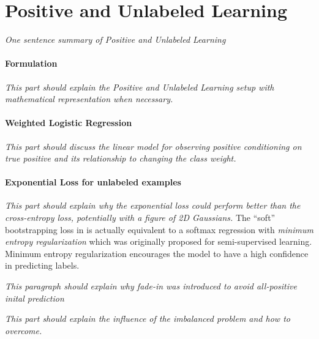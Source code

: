 \section{Positive and Unlabeled Learning}
\label{sec:pulearning}

\textit{One sentence summary of Positive and Unlabeled Learning}


\paragraph{Formulation}
\noindent
\textit{This part should explain the Positive and Unlabeled Learning setup with mathematical representation when necessary.}


\paragraph{Weighted Logistic Regression}
\noindent
\textit{This part should discuss the linear model for observing positive conditioning on true positive and its relationship to changing the class weight.}


\paragraph{Exponential Loss for unlabeled examples}
\noindent
\textit{This part should explain why the exponential loss could perform better than the cross-entropy loss, potentially with a figure of 2D Gaussians.}
The ``soft'' bootstrapping loss in \cite{reed2014training} is actually equivalent to a softmax regression with \textit{minimum entropy regularization}\cite{grandvalet2005semi} which was originally proposed for semi-supervised learning.
Minimum entropy regularization encourages the model to have a high confidence in predicting labels.

\noindent
\textit{This paragraph should explain why fade-in was introduced to avoid all-positive inital prediction}


\noindent
\textit{This part should explain the influence of the imbalanced problem and how to overcome.}



